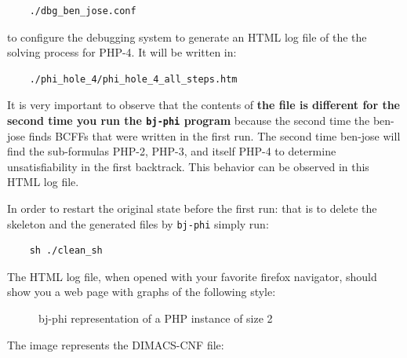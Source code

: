 \documentclass{easychair}
\newcommand{\skeleton}{\textsf{skeleton}}
\newcommand{\bjphi}{\texttt{bj-phi}}
\begin{document}
\begin{verbatim}
	./dbg_ben_jose.conf
\end{verbatim}

to configure the debugging system to generate an HTML log file of the the solving process for PHP-4. It will be written in:

\begin{verbatim}
	./phi_hole_4/phi_hole_4_all_steps.htm
\end{verbatim}

It is very important to observe that the contents of \textbf{the file is different for the second time you run the {\bjphi} program} because the second time the ben-jose finds BCFFs that were written in the first run. The second time ben-jose will find the sub-formulas PHP-2, PHP-3, and itself PHP-4 to determine unsatisfiability in the first backtrack. This behavior can be observed in this HTML log file.

In order to restart the original state before the first run: that is to delete the {\skeleton} and the generated files by {\bjphi} simply run:

\begin{verbatim}
	sh ./clean_sh
\end{verbatim}


The HTML log file, when opened with your favorite firefox navigator, should show you a web page with graphs of the following style:


\begin{figure}[H]
	\begin{centering}
		\caption{bj-phi representation of a PHP instance of size 2}
		\label{fig:h2-graph}
	\end{centering}
\end{figure}


The image represents the DIMACS-CNF file:
\end{document}
